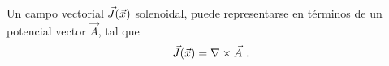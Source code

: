 \begin{corolario}
    Un campo vectorial $\vec{J}(\vec{x})$ solenoidal, puede representarse en términos de un potencial vector $\vec{A}$, tal que 
    \begin{equation}
        \vec{J}(\vec{x}) = \nabla \times \vec{A} \ .
    \end{equation}
\end{corolario}